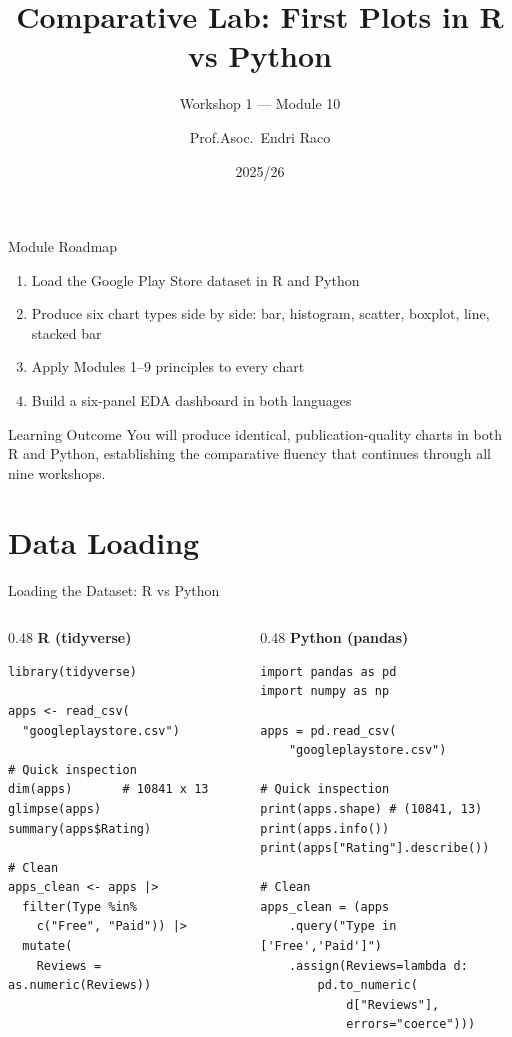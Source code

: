 \documentclass[10pt]{beamer}
\title{Comparative Lab: First Plots in R vs Python}
\subtitle{Workshop 1 --- Module 10}
\author{Prof.Asoc.\ Endri Raco}
\institute{Data Visualization for Data Scientists \\ UNYT Tirana}
\date{2025/26}
\begin{document}
\begin{frame}
  \titlepage
\end{frame}

\begin{frame}{Module Roadmap}
  \begin{enumerate}
    \item Load the Google Play Store dataset in R and Python
    \item Produce six chart types side by side: bar, histogram, scatter,
          boxplot, line, stacked bar
    \item Apply Modules 1--9 principles to every chart
    \item Build a six-panel EDA dashboard in both languages
  \end{enumerate}
  \begin{exampleblock}{Learning Outcome}
    You will produce identical, publication-quality charts in both R and
    Python, establishing the comparative fluency that continues through
    all nine workshops.
  \end{exampleblock}
\end{frame}

\section{Data Loading}

\begin{frame}[fragile]{Loading the Dataset: R vs Python}
  \begin{columns}[T]
    \begin{column}{0.48\textwidth}
      \textbf{R (tidyverse)}
\begin{lstlisting}[style=rstyle]
library(tidyverse)

apps <- read_csv(
  "googleplaystore.csv")

# Quick inspection
dim(apps)       # 10841 x 13
glimpse(apps)
summary(apps$Rating)

# Clean
apps_clean <- apps |>
  filter(Type %in%
    c("Free", "Paid")) |>
  mutate(
    Reviews = as.numeric(Reviews))
\end{lstlisting}
    \end{column}
    \begin{column}{0.48\textwidth}
      \textbf{Python (pandas)}
\begin{lstlisting}[style=pythonstyle]
import pandas as pd
import numpy as np

apps = pd.read_csv(
    "googleplaystore.csv")

# Quick inspection
print(apps.shape) # (10841, 13)
print(apps.info())
print(apps["Rating"].describe())

# Clean
apps_clean = (apps
    .query("Type in ['Free','Paid']")
    .assign(Reviews=lambda d:
        pd.to_numeric(
            d["Reviews"],
            errors="coerce")))
\end{lstlisting}
    \end{column}
  \end{columns}
\end{frame}
\end{document}
